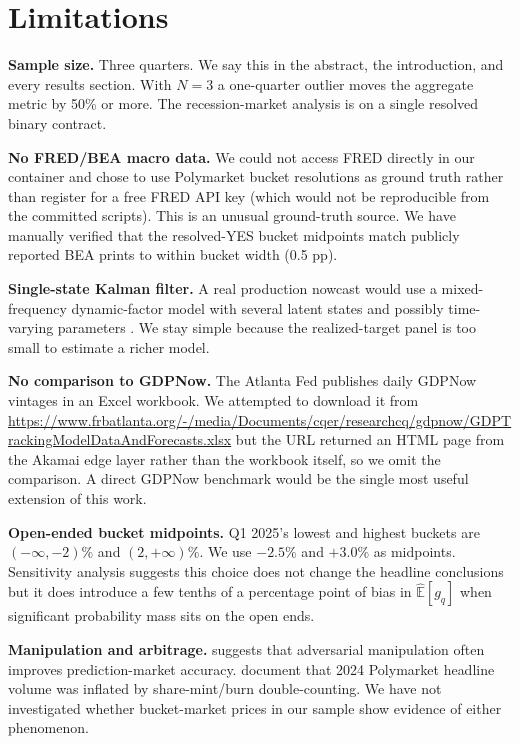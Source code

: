 \documentclass{article}
\begin{document}
\section{Limitations}
\label{sec:lim}

\textbf{Sample size.} Three quarters. We say this in the abstract, the introduction, and
every results section. With $N=3$ a one-quarter outlier moves the aggregate metric by 50\%
or more. The recession-market analysis is on a single resolved binary contract.

\textbf{No FRED/BEA macro data.} We could not access FRED directly in our container and
chose to use Polymarket bucket resolutions as ground truth rather than register for a
free FRED API key (which would not be reproducible from the committed scripts). This is
an unusual ground-truth source. We have manually verified that the resolved-YES bucket
midpoints match publicly reported BEA prints to within bucket width (0.5 pp).

\textbf{Single-state Kalman filter.} A real production nowcast would use a mixed-frequency
dynamic-factor model with several latent states and possibly time-varying parameters
\citep{banbura2013nowcasting}. We stay simple because the realized-target panel is too
small to estimate a richer model.

\textbf{No comparison to GDPNow.} The Atlanta Fed publishes daily GDPNow vintages in an
Excel workbook. We attempted to download it from
\url{https://www.frbatlanta.org/-/media/Documents/cqer/researchcq/gdpnow/GDPTrackingModelDataAndForecasts.xlsx}
but the URL returned an HTML page from the Akamai edge layer rather than the workbook
itself, so we omit the comparison. A direct GDPNow benchmark would be the
single most useful extension of this work.

\textbf{Open-ended bucket midpoints.} Q1 2025's lowest and highest buckets are
$(-\infty,-2)\%$ and $(2,+\infty)\%$. We use $-2.5\%$ and $+3.0\%$ as midpoints. Sensitivity
analysis suggests this choice does not change the headline conclusions but it does
introduce a few tenths of a percentage point of bias in $\widehat{\mathbb{E}}[g_q]$ when
significant probability mass sits on the open ends.

\textbf{Manipulation and arbitrage.} \citet{hanson2009manipulator} suggests that adversarial
manipulation often improves prediction-market accuracy. \citet{tsang2026anatomy} document
that 2024 Polymarket headline volume was inflated by share-mint/burn double-counting. We
have not investigated whether bucket-market prices in our sample show evidence of either
phenomenon.
\end{document}
